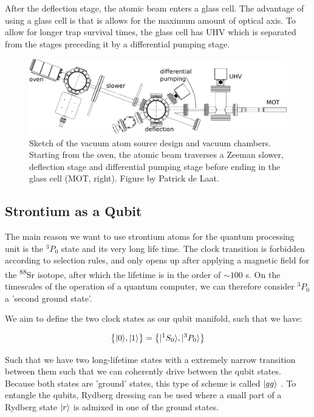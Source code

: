 After the deflection stage, the atomic beam enters a glass cell. The advantage of using a glass cell is that is allows for the maximum amount of optical axis. To allow for longer trap survival times, the glass cell has \ac{UHV} which is separated from the stages preceding it by a differential pumping stage. 

\begin{figure}
	\centering
	\includegraphics[width=0.9\linewidth]{figures/SrLoading.pdf}
	\caption{Sketch of the vacuum atom source design and vacuum chambers. Starting from the oven, the atomic beam traverses a Zeeman slower, deflection stage and differential pumping stage before ending in the glass cell (MOT, right). Figure by Patrick de Laat.}
	\label{fig:SrLoading}
\end{figure}

\subsection{Strontium as a Qubit}\label{sec:QubitScheme}

The main reason we want to use strontium atoms for the quantum processing unit is the ${}^3P_0$ state and its very long life time. The clock transition is forbidden according to selection rules, and only opens up after applying a magnetic field for the \textsuperscript{88}Sr isotope, after which the lifetime is in the order of $\sim 100$ s. On the timescales of the operation of a quantum computer, we can therefore consider ${}^3P_0$ a 'second ground state'. 

We aim to define the two clock states as our qubit manifold, such that we have:

\begin{equation}\label{eq:QubitManifold}
	\big\{\lvert0\rangle,\lvert1\rangle\big\} = 
	\left\{
		\lvert{}^1S_0\rangle, \lvert{}^3P_0\rangle 
	\right\}
\end{equation}

Such that we have two long-lifetime states with a extremely narrow transition between them such that we can coherently drive between the qubit states. Because both states are 'ground' states, this type of scheme is called $\lvert gg\rangle$ \cite{Wu2021}. To entangle the qubits, Rydberg dressing can be used \cite{Wu2021} where a small part of a Rydberg state $\lvert r\rangle$ is admixed in one of the ground states. 

